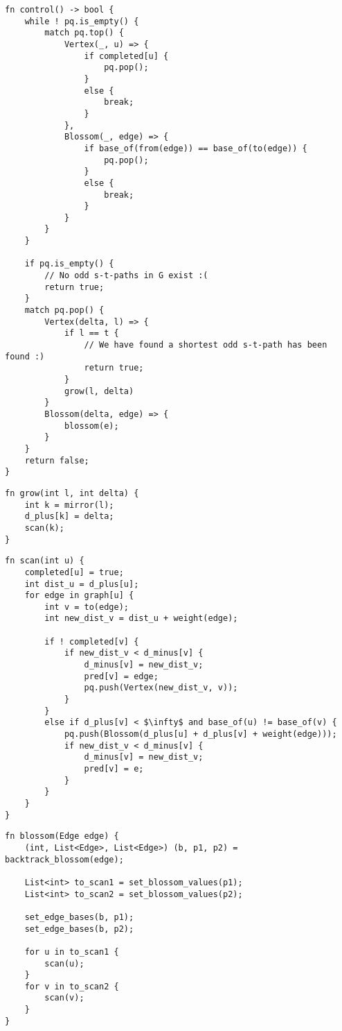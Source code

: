 \begin{lstlisting}[caption={Control, the main loop},label=Listing,mathescape=true]
fn control() -> bool {
    while ! pq.is_empty() {
        match pq.top() {
            Vertex(_, u) => {
                if completed[u] {
                    pq.pop();
                }
                else {
                    break;
                }
            },
            Blossom(_, edge) => {
                if base_of(from(edge)) == base_of(to(edge)) {
                    pq.pop();
                }
                else {
                    break;
                }
            }
        }
    }

    if pq.is_empty() {
        // No odd s-t-paths in G exist :(
        return true;
    }
    match pq.pop() {
        Vertex(delta, l) => {
            if l == t {
                // We have found a shortest odd s-t-path has been found :)
                return true;
            }
            grow(l, delta)
        }
        Blossom(delta, edge) => {
            blossom(e);
        }
    }
    return false;
}
\end{lstlisting}

\begin{lstlisting}[caption={Grow},label=Listing,mathescape=true]
fn grow(int l, int delta) {
    int k = mirror(l);
    d_plus[k] = delta;
    scan(k);
}
\end{lstlisting}

\begin{lstlisting}[caption={Scan},label=Listing,mathescape=true]
fn scan(int u) {
    completed[u] = true;
    int dist_u = d_plus[u];
    for edge in graph[u] {
        int v = to(edge);
        int new_dist_v = dist_u + weight(edge);

        if ! completed[v] {
            if new_dist_v < d_minus[v] {
                d_minus[v] = new_dist_v;
                pred[v] = edge;
                pq.push(Vertex(new_dist_v, v));
            }
        }
        else if d_plus[v] < $\infty$ and base_of(u) != base_of(v) {
            pq.push(Blossom(d_plus[u] + d_plus[v] + weight(edge)));
            if new_dist_v < d_minus[v] {
                d_minus[v] = new_dist_v;
                pred[v] = e;
            }
        }
    }
}

\end{lstlisting}

\begin{lstlisting}[caption={Blossom},label=Listing,mathescape=true]
fn blossom(Edge edge) {
    (int, List<Edge>, List<Edge>) (b, p1, p2) = backtrack_blossom(edge);

    List<int> to_scan1 = set_blossom_values(p1);
    List<int> to_scan2 = set_blossom_values(p2);

    set_edge_bases(b, p1);
    set_edge_bases(b, p2);

    for u in to_scan1 {
        scan(u);
    }
    for v in to_scan2 {
        scan(v);
    }
}
\end{lstlisting}

